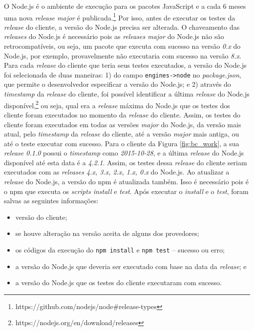 O \textsf{Node.js} é o ambiente de execução para os pacotes \textsf{JavaScript} e a cada 6 meses uma nova \textit{release major} é publicada.\footnote{https://github.com/nodejs/node\#release-types} Por isso, antes de executar os testes da \textit{release} do cliente, a versão do \textsf{Node.js} precisa ser alterada. O chaveamento das \textit{releases} do \textsf{Node.js} é necessário pois as \textit{releases major} do \textsf{Node.js} não são retrocompatíveis, ou seja, um pacote que executa com sucesso na versão \textit{0.x} do \textsf{Node.js}, por exemplo, provavelmente não executaria com sucesso na versão \textit{8.x}. Para cada \textit{release} do cliente que teria seus testes executados, a versão do \textsf{Node.js} foi selecionada de duas maneiras: 1) do campo \texttt{engines->node} no \textit{package.json}, que permite o desenvolvedor especificar a versão do \textsf{Node.js}; e 2) através do \textit{timestamp} da \textit{release} do cliente, foi possível identificar a última \textit{release} do \textsf{Node.js} disponível,\footnote{https://nodejs.org/en/download/releases} ou seja, qual era a \textit{release} máxima do \textsf{Node.js} que os testes dos cliente foram executados no momento da \textit{release} do cliente. Assim, os testes do cliente foram executados em todas as versões \textit{major} do \textsf{Node.js}, da versão mais atual, pelo \textit{timestamp} da \textit{release} do cliente, até a versão \textit{major} mais antiga, ou até o teste executar com sucesso. Para o cliente da Figura \ref{fig:bc_work}, a sua \textit{release 0.1.0} possui o \textit{timestamp} como \textit{2015-10-28}, e a última \textit{release} do \textsf{Node.js} disponível até esta data é a \textit{4.2.1}. Assim, os testes dessa \textit{release} do cliente seriam executados com as \textit{releases 4.x, 3.x, 2.x, 1.x, 0.x} do \textsf{Node.js}. Ao atualizar a \textit{release} do \textsf{Node.js}, a versão do \textsf{npm} é atualizada também. Isso é necessário pois é o \textsf{npm} que executa os \textit{scripts install} e \textit{test}. Após executar o \textit{install} e o \textit{test}, foram salvas as seguintes informações:

\begin{itemize}
    \item versão do cliente;
    \item se houve alteração na versão aceita de alguns dos provedores;
    \item os códigos da execução do \texttt{npm install} e \texttt{npm test} -- sucesso ou erro;
    \item a versão do \textsf{Node.js} que deveria ser executado com base na data da \textit{release}; e
    \item a versão do \textsf{Node.js} que os testes do cliente executaram com sucesso.
\end{itemize}{}

